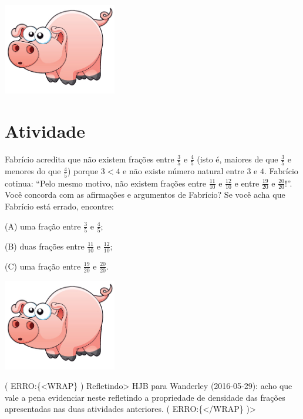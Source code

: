 \documentclass[a4,12pt]{book}
\newcounter{atividade}
\begin{document}
\includegraphics[width=\textwidth,height=4cm, keepaspectratio]{pig}
\section{Atividade}







Fabrício acredita que não existem frações entre $\frac{3}{5}$ e $\frac{4}{5}$ (isto é, maiores de que $\frac{3}{5}$ e menores do que $\frac{4}{5}$) porque $3 < 4$ e não existe número natural entre $3$ e $4$. Fabrício cotinua: ``Pelo mesmo motivo, não existem frações entre $\frac{11}{10}$ e $\frac{12}{10}$ e entre $\frac{19}{20}$ e $\frac{20}{20}$!''. Você concorda com as afirmações e argumentos de Fabrício? Se você acha que Fabrício está errado, encontre:

(A) uma fração entre $\frac{3}{5}$ e $\frac{4}{5}$;

(B) duas frações entre $\frac{11}{10}$ e $\frac{12}{10}$;

(C) uma fração entre $\frac{19}{20}$ e $\frac{20}{20}$.






\includegraphics[width=\textwidth,height=4cm, keepaspectratio]{pig}


( ERRO:\{<WRAP\} ) Refletindo>
HJB para Wanderley (2016-05-29): acho que vale a pena evidenciar neste refletindo a propriedade de densidade das frações apresentadas nas duas atividades anteriores.
( ERRO:\{</WRAP\} )>
\end{document}
